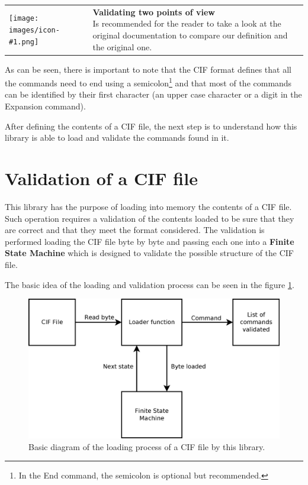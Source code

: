 \documentclass[11pt,twoside,openany,x11names,svgnames]{memoir}
\makeatletter
\newcommand{\IconNote}[3]
{
	\begin{table}[ht]
	\begin{tabular}{ lm{\dimexpr\textwidth-8\tabcolsep-\wd0}@{}}
		\toprule
		\texttt{[image: images/icon-\#1.png]}
		&
		\parbox[t]{155mm}{
		\textbf{#2} \\
		#3
		}
	\end{tabular}
\end{table}
}
\makeatother
\begin{document}
\IconNote
	{info}
	{Validating two points of view}
	{Is recommended for the reader to take a look at the original documentation to compare our definition and the original one.}

As can be seen, there is important to note that the CIF format defines that all the commands need to end using a semicolon\footnote{In the End command, the semicolon is optional but recommended.} and that most of the commands can be identified by their first character (an upper case character or a digit in the Expansion command).

After defining the contents of a CIF file, the next step is to understand how this library is able to load and validate the commands found in it.

\section{Validation of a CIF file}\label{Validation-of-a-cif-file}

This library has the purpose of loading into memory the contents of a CIF file. Such operation requires a validation of the contents loaded to be sure that they are correct and that they meet the format considered. The validation is performed loading the CIF file byte by byte and passing each one into a \textbf{Finite State Machine} which is designed to validate the possible structure of the CIF file.

The basic idea of the loading and validation process can be seen in the figure \ref{fig:basicloading}.

\begin{figure}
	\centering
	\label{fig:basicloading}
	\includegraphics[scale=0.2, clip=true, trim= 0pt 0pt 0pt 0pt]{images/chapter03-image07}
	\caption{Basic diagram of the loading process of a CIF file by this library.}
\end{figure}
\end{document}
